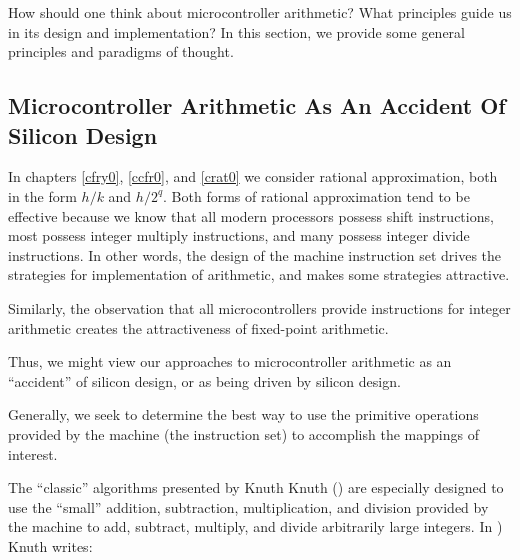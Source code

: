 How should one think about microcontroller arithmetic?  What principles
guide us in its design and implementation?  In this section,
we provide some general principles and paradigms of thought.


\subsection{Microcontroller Arithmetic As An Accident Of Silicon Design}
\label{ccil0:sppm0:smas0}

In chapters
\ref{cfry0},
\ref{ccfr0},
and 
\ref{crat0} 
we consider rational approximation,
both in the form $h/k$ and $h/2^q$.  Both forms of rational approximation
tend to be effective because we know that all modern processors possess
shift instructions, most possess integer multiply instructions, and many 
possess integer divide instructions.  In other words, the design
of the machine instruction set drives the strategies for implementation
of arithmetic, and makes some strategies attractive.

Similarly, the observation that all microcontrollers provide instructions
for integer arithmetic creates the attractiveness of fixed-point arithmetic.

Thus, we might view our approaches to microcontroller arithmetic as 
an ``accident'' of silicon design, or as being driven by silicon
design.

Generally, we seek to determine the best way to use the primitive
operations provided by the machine (the instruction set) to 
accomplish the mappings of interest.

The ``classic'' algorithms 
presented by Knuth 
Knuth (\cite[pp. 265-284]{bibref:b:knuthclassic2ndedvol2}) are especially
designed to use the ``small'' addition, subtraction, multiplication, and
division provided by the machine to add, subtract, multiply, and divide arbitrarily
large integers.  In 
\cite[pp. 265-266]{bibref:b:knuthclassic2ndedvol2}) Knuth writes:

